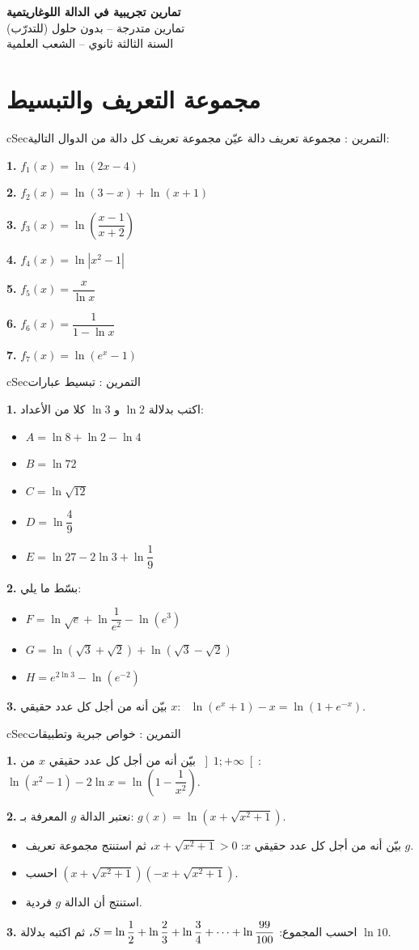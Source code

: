 \documentclass[12pt,a4paper]{article}
\newenvironment{BOX}[2]{\begin{otherlanguage}{english}\begin{arbox}{#1}{#2}}{\end{arbox}\end{otherlanguage}}
\newcounter{exo}
\newenvironment{tamrin}[1]{\stepcounter{exo}\begin{BOX}{cSec}{التمرين \theexo: #1}}{\end{BOX}}
\newenvironment{LTR}{\begin{otherlanguage}{english}}{\end{otherlanguage}}
\renewcommand{\cdots}{\mathinner{\cdotp\cdotp\cdotp}}
\newenvironment{sq}{\begin{itemize}[leftmargin=2.4em,itemsep=3pt]}{\end{itemize}}
\newcommand{\qa}{\item[(أ)]}\newcommand{\qb}{\item[(ب)]}\newcommand{\qc}{\item[(جـ)]}\newcommand{\qd}{\item[(د)]}\newcommand{\qe}{\item[(هـ)]}
\newcommand{\QQ}[1]{\par\smallskip\textbf{#1.} }
\begin{document}
\begin{LTR}
\begin{tcolorbox}[enhanced,colback=cSec,colframe=cSec,arc=3mm,halign=center,boxrule=0pt,top=12pt,bottom=12pt,before upper={\selectlanguage{arabic}}]
{\color{white}\fontsize{26}{32}\selectfont\bfseries تمارين تجريبية في الدالة اللوغاريتمية}\\[8pt]
{\color{white}\large تمارين متدرجة -- بدون حلول (للتدرّب)}\\[5pt]
{\color{white}\large السنة الثالثة ثانوي -- الشعب العلمية}
\end{tcolorbox}
\end{LTR}
\section{مجموعة التعريف والتبسيط}

\begin{tamrin}{مجموعة تعريف دالة}
عيّن مجموعة تعريف كل دالة من الدوال التالية:
\QQ{1} $f_1(x)=\ln(2x-4)$
\QQ{2} $f_2(x)=\ln(3-x)+\ln(x+1)$
\QQ{3} $f_3(x)=\ln\left(\dfrac{x-1}{x+2}\right)$
\QQ{4} $f_4(x)=\ln\left|x^2-1\right|$
\QQ{5} $f_5(x)=\dfrac{x}{\ln x}$
\QQ{6} $f_6(x)=\dfrac{1}{1-\ln x}$
\QQ{7} $f_7(x)=\ln\left(e^{x}-1\right)$
\end{tamrin}

\begin{tamrin}{تبسيط عبارات}
\QQ{1} اكتب بدلالة $\ln 2$ و $\ln 3$ كلا من الأعداد:
\begin{sq}
\qa $A=\ln 8+\ln 2-\ln 4$
\qb $B=\ln 72$
\qc $C=\ln\sqrt{12}$
\qd $D=\ln\dfrac{4}{9}$
\qe $E=\ln 27-2\ln 3+\ln\dfrac{1}{9}$
\end{sq}
\QQ{2} بسّط ما يلي:
\begin{sq}
\qa $F=\ln\sqrt{e}+\ln\dfrac{1}{e^{2}}-\ln\left(e^{3}\right)$
\qb $G=\ln\left(\sqrt{3}+\sqrt{2}\right)+\ln\left(\sqrt{3}-\sqrt{2}\right)$
\qc $H=e^{2\ln 3}-\ln\left(e^{-2}\right)$
\end{sq}
\QQ{3} بيّن أنه من أجل كل عدد حقيقي $x$: \ $\ln\left(e^{x}+1\right)-x=\ln\left(1+e^{-x}\right)$.
\end{tamrin}

\begin{tamrin}{خواص جبرية وتطبيقات}
\QQ{1} بيّن أنه من أجل كل عدد حقيقي $x$ من $\left]1;+\infty\right[$:
\ $\ln\left(x^{2}-1\right)-2\ln x=\ln\left(1-\dfrac{1}{x^{2}}\right)$.
\QQ{2} نعتبر الدالة $g$ المعرفة بـ: $g(x)=\ln\left(x+\sqrt{x^{2}+1}\right)$.
\begin{sq}
\qa بيّن أنه من أجل كل عدد حقيقي $x$: $x+\sqrt{x^{2}+1}>0$، ثم استنتج مجموعة تعريف $g$.
\qb احسب $\left(x+\sqrt{x^{2}+1}\right)\left(-x+\sqrt{x^{2}+1}\right)$.
\qc استنتج أن الدالة $g$ فردية.
\end{sq}
\QQ{3} احسب المجموع: $S=\ln\dfrac12+\ln\dfrac23+\ln\dfrac34+\cdots+\ln\dfrac{99}{100}$، ثم اكتبه بدلالة $\ln 10$.
\end{tamrin}
\end{document}

